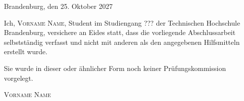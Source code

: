 \thispagestyle{empty}

\large
\begin{flushright}
  Brandenburg, den 25. Oktober 2027
\end{flushright}

\vspace*{50mm}
Ich, {\scshape Vorname Name}, Student im Studiengang ??? der
Technischen Hochschule Brandenburg, versichere an Eides statt, dass die vorliegende
Abschlussarbeit selbstständig verfasst und nicht mit anderen als den
angegebenen Hilfsmitteln erstellt wurde.

Sie wurde in dieser oder ähnlicher Form noch keiner Prüfungskommission
vorgelegt.\\

\vspace*{50mm}

\begin{flushright}
  {\scshape Vorname Name}
\end{flushright}

\normalsize